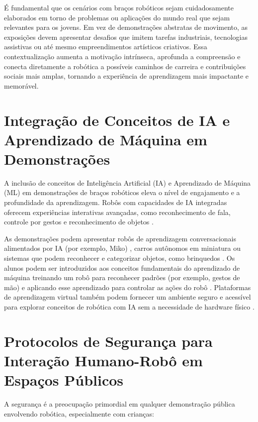 \documentclass[%
  12pt,%
  a4paper,%
  oneside,%
  openright,%
  sumario = abnt-6027-2012,%
  chapter = TITLE,%
  pretextualoneside,%
  fontetimes,%
  semrecuonosumario,%
  usemakeindex,%
  pardeassinaturas,%
  english,%
  french,%
  spanish,%
  brazil,%
]{utfpr}%
\begin{document}
É fundamental que os cenários com braços robóticos sejam cuidadosamente elaborados em torno de problemas ou aplicações do mundo real que sejam relevantes para os jovens. Em vez de demonstrações abstratas de movimento, as exposições devem apresentar desafios que imitem tarefas industriais, tecnologias assistivas ou até mesmo empreendimentos artísticos criativos. Essa contextualização aumenta a motivação intrínseca, aprofunda a compreensão e conecta diretamente a robótica a possíveis caminhos de carreira e contribuições sociais mais amplas, tornando a experiência de aprendizagem mais impactante e memorável.

\section{Integração de Conceitos de IA e Aprendizado de Máquina em Demonstrações}
A inclusão de conceitos de Inteligência Artificial (IA) e Aprendizado de Máquina (ML) em demonstrações de braços robóticos eleva o nível de engajamento e a profundidade da aprendizagem. Robôs com capacidades de IA integradas oferecem experiências interativas avançadas, como reconhecimento de fala, controle por gestos e reconhecimento de objetos \cite{vexRoboticsHome2025}.

As demonstrações podem apresentar robôs de aprendizagem conversacionais alimentados por IA (por exemplo, Miko) \cite{mikoAIPoweredRobot2025}, carros autônomos em miniatura \cite{stempediaProjects2025} ou sistemas que podem reconhecer e categorizar objetos, como brinquedos \cite{stempediaProjects2025}. Os alunos podem ser introduzidos aos conceitos fundamentais do aprendizado de máquina treinando um robô para reconhecer padrões (por exemplo, gestos de mão) e aplicando esse aprendizado para controlar as ações do robô \cite{stempediaProjects2025}. Plataformas de aprendizagem virtual também podem fornecer um ambiente seguro e acessível para explorar conceitos de robótica com IA sem a necessidade de hardware físico \cite{coderoboPickPlace2025}.

\section{Protocolos de Segurança para Interação Humano-Robô em Espaços Públicos}
A segurança é a preocupação primordial em qualquer demonstração pública envolvendo robótica, especialmente com crianças:
\end{document}
